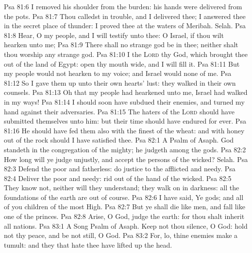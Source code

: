 \vs Psa 81:6 I removed his shoulder from the burden: his hands were delivered from the pots.
\vs Psa 81:7 Thou calledst in trouble, and I delivered thee; I answered thee in the secret place of thunder: I proved thee at the waters of Meribah. Selah.
\vs Psa 81:8 Hear, O my people, and I will testify unto thee: O Israel, if thou wilt hearken unto me;
\vs Psa 81:9 There shall no strange god be in thee; neither shalt thou worship any strange god.
\vs Psa 81:10 I  the \textsc{Lord} thy God, which brought thee out of the land of Egypt: open thy mouth wide, and I will fill it.
\vs Psa 81:11 But my people would not hearken to my voice; and Israel would none of me.
\vs Psa 81:12 So I gave them up unto their own hearts' lust:  they walked in their own counsels.
\vs Psa 81:13 Oh that my people had hearkened unto me,  Israel had walked in my ways!
\vs Psa 81:14 I should soon have subdued their enemies, and turned my hand against their adversaries.
\vs Psa 81:15 The haters of the \textsc{Lord} should have submitted themselves unto him: but their time should have endured for ever.
\vs Psa 81:16 He should have fed them also with the finest of the wheat: and with honey out of the rock should I have satisfied thee.
\vs Psa 82:1 A Psalm of Asaph. God standeth in the congregation of the mighty; he judgeth among the gods.
\vs Psa 82:2 How long will ye judge unjustly, and accept the persons of the wicked? Selah.
\vs Psa 82:3 Defend the poor and fatherless: do justice to the afflicted and needy.
\vs Psa 82:4 Deliver the poor and needy: rid  out of the hand of the wicked.
\vs Psa 82:5 They know not, neither will they understand; they walk on in darkness: all the foundations of the earth are out of course.
\vs Psa 82:6 I have said, Ye  gods; and all of you  children of the most High.
\vs Psa 82:7 But ye shall die like men, and fall like one of the princes.
\vs Psa 82:8 Arise, O God, judge the earth: for thou shalt inherit all nations.
\vs Psa 83:1 A Song  Psalm of Asaph. Keep not thou silence, O God: hold not thy peace, and be not still, O God.
\vs Psa 83:2 For, lo, thine enemies make a tumult: and they that hate thee have lifted up the head.
